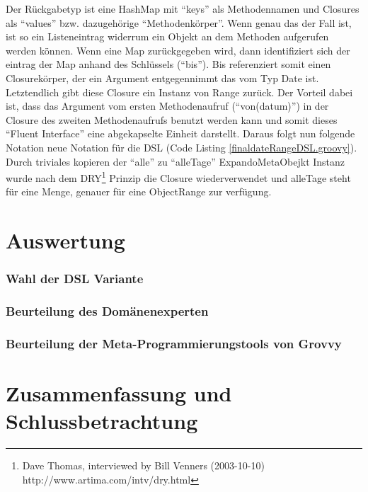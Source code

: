 \documentclass[11pt,english,ngerman, headsepline]{scrreprt}
\begin{document}
Der Rückgabetyp ist eine HashMap mit ``keys'' als Methodennamen und
Closures als ``values'' bzw. dazugehörige ``Methodenkörper''.
Wenn genau das der Fall ist, ist so ein Listeneintrag widerrum ein Objekt an dem
Methoden aufgerufen werden können. Wenn eine Map zurückgegeben wird, dann
identifiziert sich der eintrag der Map anhand des Schlüssels (``bis''). Bis
referenziert somit einen Closurekörper, der ein Argument entgegennimmt das vom
Typ Date ist. Letztendlich gibt diese Closure ein Instanz von Range zurück. Der
Vorteil dabei ist, dass das Argument vom ersten Methodenaufruf (``von(datum)'')
in der Closure des zweiten Methodenaufrufs benutzt werden kann und somit dieses
``Fluent Interface'' eine abgekapselte Einheit darstellt.
Daraus folgt nun folgende Notation neue Notation für die DSL (Code Listing
\ref{finaldateRangeDSL.groovy}).
Durch triviales kopieren der ``alle'' zu ``alleTage'' ExpandoMetaObejkt Instanz
wurde nach dem DRY\footnote{Dave Thomas, interviewed by Bill Venners
(2003-10-10) http://www.artima.com/intv/dry.html} Prinzip die Closure
wiederverwendet und alleTage steht für eine Menge, genauer für eine ObjectRange zur verfügung.











\chapter{Auswertung}

\subsection{Wahl der DSL Variante}

\subsection{Beurteilung des Domänenexperten}

\subsection{Beurteilung der Meta-Programmierungstools von Grovvy}
 
\chapter{Zusammenfassung und Schlussbetrachtung}
\end{document}
